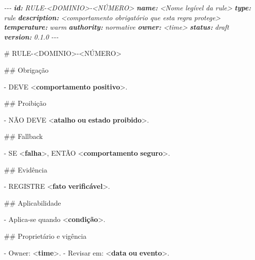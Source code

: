 \documentclass[
  10pt,
  a4paper,
  oneside]{book}
\newenvironment{Shaded}{}{}
\newcommand{\AnnotationTok}[1]{\textcolor[rgb]{0.38,0.63,0.69}{\textbf{\textit{#1}}}}
\newcommand{\CommentTok}[1]{\textcolor[rgb]{0.38,0.63,0.69}{\textit{#1}}}
\newcommand{\DataTypeTok}[1]{\textcolor[rgb]{0.56,0.13,0.00}{#1}}
\newcommand{\ErrorTok}[1]{\textcolor[rgb]{1.00,0.00,0.00}{\textbf{#1}}}
\newcommand{\FunctionTok}[1]{\textcolor[rgb]{0.02,0.16,0.49}{#1}}
\newcommand{\KeywordTok}[1]{\textcolor[rgb]{0.00,0.44,0.13}{\textbf{#1}}}
\newcommand{\NormalTok}[1]{#1}
\newcommand{\SpecialStringTok}[1]{\textcolor[rgb]{0.73,0.40,0.53}{#1}}
\begin{document}
\begin{Shaded}
\begin{Highlighting}[]
\CommentTok{{-}{-}{-}}
\AnnotationTok{id:}\CommentTok{ RULE{-}\textless{}DOMINIO\textgreater{}{-}\textless{}NÚMERO\textgreater{}}
\AnnotationTok{name:}\CommentTok{ \textless{}Nome legível da rule\textgreater{}}
\AnnotationTok{type:}\CommentTok{ rule}
\AnnotationTok{description:}\CommentTok{ \textless{}comportamento obrigatório que esta regra protege\textgreater{}}
\AnnotationTok{temperature:}\CommentTok{ warm}
\AnnotationTok{authority:}\CommentTok{ normative}
\AnnotationTok{owner:}\CommentTok{ \textless{}time\textgreater{}}
\AnnotationTok{status:}\CommentTok{ draft}
\AnnotationTok{version:}\CommentTok{ 0.1.0}
\CommentTok{{-}{-}{-}}

\FunctionTok{\# RULE{-}\textless{}DOMINIO\textgreater{}{-}\textless{}NÚMERO\textgreater{}}

\FunctionTok{\#\# Obrigação}

\SpecialStringTok{{-} }\NormalTok{DEVE }\DataTypeTok{\textless{}}\KeywordTok{comportamento} \ErrorTok{positivo}\DataTypeTok{\textgreater{}}\NormalTok{.}

\FunctionTok{\#\# Proibição}

\SpecialStringTok{{-} }\NormalTok{NÃO DEVE }\DataTypeTok{\textless{}}\KeywordTok{atalho} \ErrorTok{ou} \ErrorTok{estado} \ErrorTok{proibido}\DataTypeTok{\textgreater{}}\NormalTok{.}

\FunctionTok{\#\# Fallback}

\SpecialStringTok{{-} }\NormalTok{SE }\DataTypeTok{\textless{}}\KeywordTok{falha}\DataTypeTok{\textgreater{}}\NormalTok{, ENTÃO }\DataTypeTok{\textless{}}\KeywordTok{comportamento} \ErrorTok{seguro}\DataTypeTok{\textgreater{}}\NormalTok{.}

\FunctionTok{\#\# Evidência}

\SpecialStringTok{{-} }\NormalTok{REGISTRE }\DataTypeTok{\textless{}}\KeywordTok{fato} \ErrorTok{verificável}\DataTypeTok{\textgreater{}}\NormalTok{.}

\FunctionTok{\#\# Aplicabilidade}

\SpecialStringTok{{-} }\NormalTok{Aplica{-}se quando }\DataTypeTok{\textless{}}\KeywordTok{condição}\DataTypeTok{\textgreater{}}\NormalTok{.}

\FunctionTok{\#\# Proprietário e vigência}

\SpecialStringTok{{-} }\NormalTok{Owner: }\DataTypeTok{\textless{}}\KeywordTok{time}\DataTypeTok{\textgreater{}}\NormalTok{.}
\SpecialStringTok{{-} }\NormalTok{Revisar em: }\DataTypeTok{\textless{}}\KeywordTok{data} \ErrorTok{ou} \ErrorTok{evento}\DataTypeTok{\textgreater{}}\NormalTok{.}
\end{Highlighting}
\end{Shaded}
\end{document}
